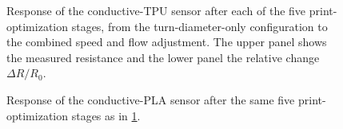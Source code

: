 \begin{figure}
\centering

    \caption{Response of the conductive-TPU sensor after each of the five print-optimization stages, from the turn-diameter-only configuration to the combined speed and flow adjustment. The upper panel shows the measured resistance and the lower panel the relative change $\Delta R/R_0$.}
    \label{fig:opt_tpu}
\end{figure}

\begin{figure}
\centering

    \caption{Response of the conductive-PLA sensor after the same five print-optimization stages as in \cref{fig:opt_tpu}.}
    \label{fig:opt_pla}
\end{figure}




